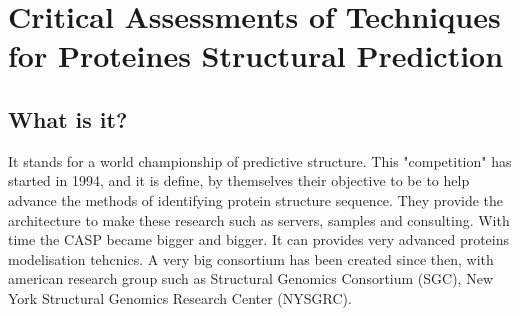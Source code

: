 \section{Critical Assessments  of Techniques  for Proteines Structural Prediction}
\subsection{What is it?}

It stands for a world championship of predictive structure. This "competition" has started in 1994, and it is define, by themselves their objective to be to help advance the methods of identifying protein structure sequence. They provide the architecture to make these research such as servers, samples and consulting.
\newline
With time the CASP became bigger and bigger. It can provides very advanced proteins modelisation tehcnics. A very big consortium has been created since then, with american research group such as Structural Genomics Consortium (SGC), New York Structural Genomics Research Center (NYSGRC).